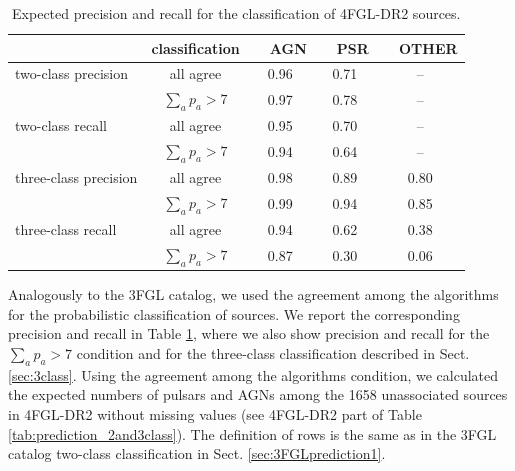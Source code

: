 \documentclass[referee]{aa} %
\begin{document}
\begin{table}[!h]
    \caption{Expected precision and recall for the classification of 4FGL-DR2 sources.}
    \label{tab:prec_recall_4FGL}

\centering
    \tiny
  
 \renewcommand{\tabcolsep}{0.3mm}
\renewcommand{\arraystretch}{1.5}

    \begin{tabular}{l c c c c}
    \hline
    \hline
    & classification &\ \  AGN &\ \   PSR &\ \   OTHER \\
    \hline
    two-class precision & all     agree            & 0.96 &  0.71 & --  \\ 
                                & $\sum_a p_a > 7$ & 0.97 &  0.78  & -- \\
    \hline
    two-class recall       & all     agree            & 0.95 &  0.70 & --  \\ 
                                & $\sum_a p_a > 7$ & 0.94 &  0.64  & -- \\
    \hline
    three-class precision & all     agree            & 0.98 & 0.89  & 0.80  \\ 
                                & $\sum_a p_a > 7$ & 0.99 &  0.94  & 0.85 \\
    \hline
    three-class recall       & all     agree            & 0.94 &  0.62 & 0.38  \\ 
                                & $\sum_a p_a > 7$ & 0.87 &  0.30  & 0.06 \\
    \hline
    \end{tabular}%
\end{table}

Analogously to the 3FGL catalog, we used the agreement among the algorithms for the probabilistic classification of sources.
We report the corresponding precision and recall in Table \ref{tab:prec_recall_4FGL}, where we also show precision and recall
for the $\sum_a p_a > 7$ condition and for the three-class classification described in Sect. \ref{sec:3class}.
Using the agreement among the algorithms condition,
we calculated the expected numbers of pulsars and AGNs among the 1658 unassociated sources in 4FGL-DR2 without missing values 
(see 4FGL-DR2 part of Table \ref{tab:prediction_2and3class}).
The definition of rows is the same as in the 3FGL catalog two-class classification in Sect. \ref{sec:3FGLprediction1}.
\end{document}
